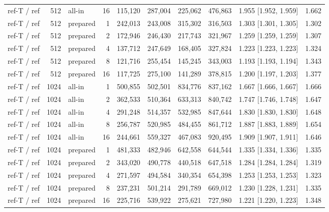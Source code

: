 \begin{table}[t]
{\begin{tabular}{lrlrrrrrlr}
ref-T / ref & 512 & all-in & 16 & 115{,}120 & 287{,}004 & 225{,}062 & 476{,}863 & 1.955 [1.952, 1.959] & 1.662 \\
ref-T / ref & 512 & prepared & 1 & 242{,}013 & 243{,}008 & 315{,}302 & 316{,}503 & 1.303 [1.301, 1.305] & 1.302 \\
ref-T / ref & 512 & prepared & 2 & 172{,}946 & 246{,}430 & 217{,}743 & 321{,}967 & 1.259 [1.259, 1.259] & 1.307 \\
ref-T / ref & 512 & prepared & 4 & 137{,}712 & 247{,}649 & 168{,}405 & 327{,}824 & 1.223 [1.223, 1.223] & 1.324 \\
ref-T / ref & 512 & prepared & 8 & 121{,}716 & 255{,}454 & 145{,}245 & 343{,}003 & 1.193 [1.193, 1.194] & 1.343 \\
ref-T / ref & 512 & prepared & 16 & 117{,}725 & 275{,}100 & 141{,}289 & 378{,}815 & 1.200 [1.197, 1.203] & 1.377 \\
ref-T / ref & 1024 & all-in & 1 & 500{,}855 & 502{,}501 & 834{,}776 & 837{,}162 & 1.667 [1.666, 1.667] & 1.666 \\
ref-T / ref & 1024 & all-in & 2 & 362{,}533 & 510{,}364 & 633{,}313 & 840{,}742 & 1.747 [1.746, 1.748] & 1.647 \\
ref-T / ref & 1024 & all-in & 4 & 291{,}248 & 514{,}357 & 532{,}985 & 847{,}644 & 1.830 [1.830, 1.830] & 1.648 \\
ref-T / ref & 1024 & all-in & 8 & 256{,}787 & 520{,}985 & 484{,}455 & 861{,}712 & 1.887 [1.883, 1.889] & 1.654 \\
ref-T / ref & 1024 & all-in & 16 & 244{,}661 & 559{,}327 & 467{,}083 & 920{,}495 & 1.909 [1.907, 1.911] & 1.646 \\
ref-T / ref & 1024 & prepared & 1 & 481{,}333 & 482{,}946 & 642{,}558 & 644{,}544 & 1.335 [1.334, 1.336] & 1.335 \\
ref-T / ref & 1024 & prepared & 2 & 343{,}020 & 490{,}778 & 440{,}518 & 647{,}518 & 1.284 [1.284, 1.284] & 1.319 \\
ref-T / ref & 1024 & prepared & 4 & 271{,}597 & 494{,}584 & 340{,}354 & 654{,}398 & 1.253 [1.253, 1.253] & 1.323 \\
ref-T / ref & 1024 & prepared & 8 & 237{,}231 & 501{,}214 & 291{,}789 & 669{,}012 & 1.230 [1.228, 1.231] & 1.335 \\
ref-T / ref & 1024 & prepared & 16 & 225{,}716 & 539{,}922 & 275{,}621 & 727{,}980 & 1.221 [1.220, 1.223] & 1.348 \\
\bottomrule
\end{tabular}}
\end{table}

